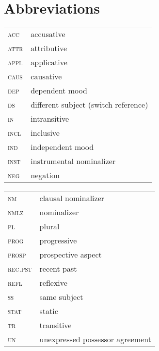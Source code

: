 \documentclass[output=paper]{langscibook}
\begin{document}
\section*{Abbreviations}
\begin{tabularx}{.45\textwidth}{lQ}
{\scshape acc} & accusative\\
{\scshape attr} & attributive\\ 
{\scshape appl} & applicative\\
{\scshape caus} & causative\\
{\scshape dep} & dependent mood\\
{\scshape ds} & different subject (switch reference)\\
{\scshape in} & intransitive \\
{\scshape incl} & inclusive\\
{\scshape ind} & independent mood\\
{\scshape inst} & instrumental nominalizer\\
{\scshape neg} & negation\\
\end{tabularx}
 \begin{tabularx}{.45\textwidth}{lQ}
 {\scshape nm} & clausal nominalizer\\
 {\scshape nmlz} & nominalizer\\
 {\scshape pl} & plural\\
 {\scshape prog} & progressive\\
 {\scshape prosp} & prospective aspect\\
 {\scshape rec.pst} & recent past\\
 {\scshape refl} & reflexive\\
 {\scshape ss} & same subject\\
 {\scshape stat} & static\\
 {\scshape tr} & transitive\\
 {\scshape un} & unexpressed possessor agreement\\
\end{tabularx}

\sloppy\printbibliography[heading=subbibliography,notkeyword=this]

    
\end{document}
